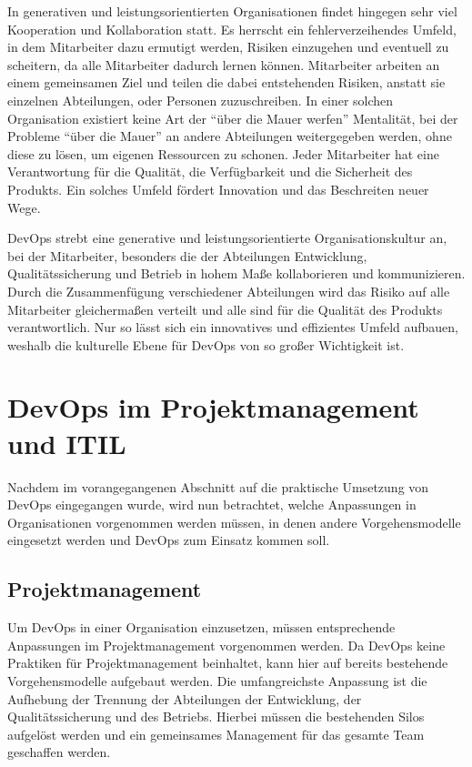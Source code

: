 In generativen und leistungsorientierten Organisationen findet hingegen sehr viel Kooperation und Kollaboration statt. 
Es herrscht ein fehlerverzeihendes Umfeld, in dem Mitarbeiter dazu ermutigt werden, Risiken einzugehen und eventuell zu scheitern, da alle Mitarbeiter dadurch lernen können. 
Mitarbeiter arbeiten an einem gemeinsamen Ziel und teilen die dabei entstehenden Risiken, anstatt sie einzelnen Abteilungen, oder Personen zuzuschreiben. In einer solchen Organisation existiert keine Art der \enquote{über die Mauer werfen} Mentalität, bei der Probleme \enquote{über die Mauer} an andere Abteilungen weitergegeben werden, ohne diese zu lösen, um eigenen Ressourcen zu schonen. 
Jeder Mitarbeiter hat eine Verantwortung für die Qualität, die Verfügbarkeit und die Sicherheit des Produkts. 
Ein solches Umfeld fördert Innovation und das Beschreiten neuer Wege. \parencite[vgl.][S. 2]{westrum:2004}

DevOps strebt eine generative und leistungsorientierte Organisationskultur an, bei der Mitarbeiter, besonders die der Abteilungen Entwicklung, Qualitätssicherung und Betrieb in hohem Maße kollaborieren und kommunizieren. 
Durch die Zusammenfügung verschiedener Abteilungen wird das Risiko auf alle Mitarbeiter gleichermaßen verteilt und alle sind für die Qualität des Produkts verantwortlich.
Nur so lässt sich ein innovatives und effizientes Umfeld aufbauen, weshalb die kulturelle Ebene für DevOps von so großer Wichtigkeit ist.

\section{DevOps im Projektmanagement und ITIL} %
Nachdem im vorangegangenen Abschnitt auf die praktische Umsetzung von DevOps eingegangen wurde, wird nun betrachtet, welche Anpassungen in Organisationen vorgenommen werden müssen, in denen andere Vorgehensmodelle eingesetzt werden und DevOps zum Einsatz kommen soll.

\subsection{Projektmanagement}
Um DevOps in einer Organisation einzusetzen, müssen entsprechende Anpassungen im Projektmanagement vorgenommen werden. 
Da DevOps keine Praktiken für Projektmanagement beinhaltet, kann hier auf bereits bestehende Vorgehensmodelle aufgebaut werden.
 Die umfangreichste Anpassung ist die Aufhebung der Trennung der Abteilungen der Entwicklung, der Qualitätssicherung und des Betriebs. 
 Hierbei müssen die bestehenden Silos aufgelöst werden und ein gemeinsames Management für das gesamte Team geschaffen werden.
 
